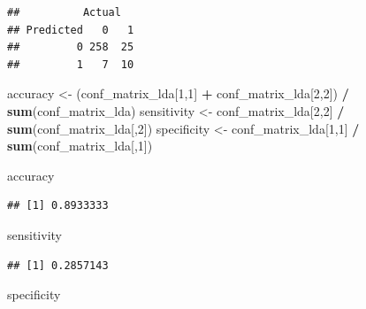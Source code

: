 \documentclass[
]{article}
\newenvironment{Shaded}{\begin{snugshade}}{\end{snugshade}}
\newcommand{\AttributeTok}[1]{\textcolor[rgb]{0.13,0.29,0.53}{#1}}
\newcommand{\DecValTok}[1]{\textcolor[rgb]{0.00,0.00,0.81}{#1}}
\newcommand{\FunctionTok}[1]{\textcolor[rgb]{0.13,0.29,0.53}{\textbf{#1}}}
\newcommand{\NormalTok}[1]{#1}
\newcommand{\OtherTok}[1]{\textcolor[rgb]{0.56,0.35,0.01}{#1}}
\newcommand{\SpecialCharTok}[1]{\textcolor[rgb]{0.81,0.36,0.00}{\textbf{#1}}}
\begin{document}
\begin{Shaded}
\end{Shaded}

\begin{verbatim}
##          Actual
## Predicted   0   1
##         0 258  25
##         1   7  10
\end{verbatim}

\begin{Shaded}
\begin{Highlighting}[]
\NormalTok{accuracy }\OtherTok{\textless{}{-}}\NormalTok{ (conf\_matrix\_lda[}\DecValTok{1}\NormalTok{,}\DecValTok{1}\NormalTok{] }\SpecialCharTok{+}\NormalTok{ conf\_matrix\_lda[}\DecValTok{2}\NormalTok{,}\DecValTok{2}\NormalTok{]) }\SpecialCharTok{/} \FunctionTok{sum}\NormalTok{(conf\_matrix\_lda)}
\NormalTok{sensitivity }\OtherTok{\textless{}{-}}\NormalTok{ conf\_matrix\_lda[}\DecValTok{2}\NormalTok{,}\DecValTok{2}\NormalTok{] }\SpecialCharTok{/} \FunctionTok{sum}\NormalTok{(conf\_matrix\_lda[,}\DecValTok{2}\NormalTok{])}
\NormalTok{specificity }\OtherTok{\textless{}{-}}\NormalTok{ conf\_matrix\_lda[}\DecValTok{1}\NormalTok{,}\DecValTok{1}\NormalTok{] }\SpecialCharTok{/} \FunctionTok{sum}\NormalTok{(conf\_matrix\_lda[,}\DecValTok{1}\NormalTok{])}

\NormalTok{accuracy}
\end{Highlighting}
\end{Shaded}

\begin{verbatim}
## [1] 0.8933333
\end{verbatim}

\begin{Shaded}
\begin{Highlighting}[]
\NormalTok{sensitivity}
\end{Highlighting}
\end{Shaded}

\begin{verbatim}
## [1] 0.2857143
\end{verbatim}

\begin{Shaded}
\begin{Highlighting}[]
\NormalTok{specificity}
\end{Highlighting}
\end{Shaded}
\end{document}
